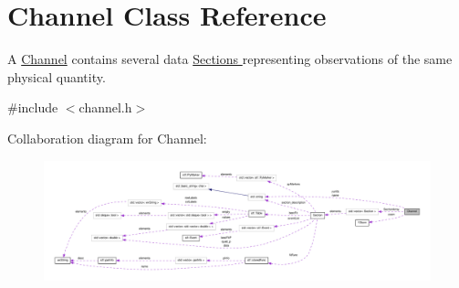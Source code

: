 \hypertarget{classChannel}{
\section{Channel Class Reference}
\label{classChannel}
}


A \hyperlink{classChannel}{Channel} contains several data \hyperlink{classSection}{Sections } representing observations of the same physical quantity.  




{\ttfamily \#include $<$channel.h$>$}



Collaboration diagram for Channel:
\nopagebreak
\begin{figure}[H]
\begin{center}
\leavevmode
\includegraphics[width=400pt]{classChannel__coll__graph}
\end{center}
\end{figure}
